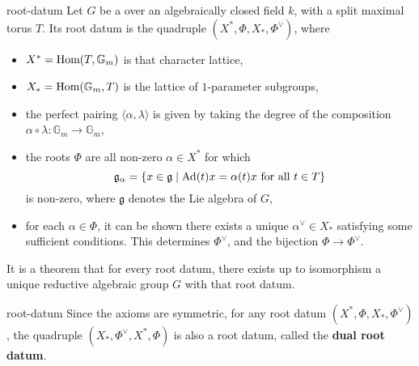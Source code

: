 \begin{example}{root-datum}
    Let $G$ be a  over an algebraically closed field $k$, with a split maximal torus $T$. Its root datum is the quadruple $(X^*, \Phi, X_*, \Phi^\vee)$, where
    \begin{itemize}
        \item $X^* = \text{Hom}(T, \mathbb{G}_m)$ is that character lattice,
        \item $X_* = \text{Hom}(\mathbb{G}_m, T)$ is the lattice of $1$-parameter subgroups,
        \item the perfect pairing $\langle \alpha, \lambda \rangle$ is given by taking the degree of the composition $\alpha \circ \lambda : \mathbb{G}_m \to \mathbb{G}_m$,
        \item the roots $\Phi$ are all non-zero $\alpha \in X^*$ for which
        \[ \mathfrak{g}_\alpha = \{ x \in \mathfrak{g} \mid \textup{Ad}(t) x = \alpha(t) x \textup{ for all } t \in T \} \]
        is non-zero, where $\mathfrak{g}$ denotes the Lie algebra of $G$,
        \item for each $\alpha \in \Phi$, it can be shown there exists a unique $\alpha^\vee \in X_*$ satisfying some sufficient conditions. This determines $\Phi^\vee$, and the bijection $\Phi \to \Phi^\vee$.
    \end{itemize}
    
    It is a theorem that for every root datum, there exists up to isomorphism a unique reductive algebraic group $G$ with that root datum.
\end{example}

\begin{example}{root-datum}
    Since the axioms are symmetric, for any root datum $(X^*, \Phi, X_*, \Phi^\vee)$, the quadruple $(X_*, \Phi^\vee, X^*, \Phi)$ is also a root datum, called the \textbf{dual root datum}.
\end{example}

